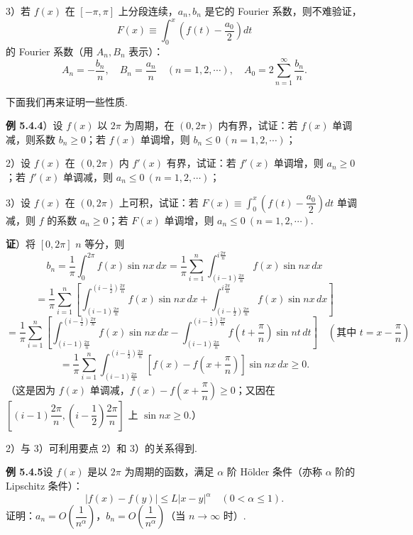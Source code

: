 \documentclass[UTF8, 12pt, fontset=fandol, oneside]{ctexart}
\begin{document}
3）若 $f(x)$ 在 $[-\pi,\pi]$ 上分段连续，$a_n,b_n$ 是它的 Fourier 系数，则不难验证，
\[
  F(x)\equiv\int_0^x\left(f(t)-\frac{a_0}2\right)dt
\]
的 Fourier 系数（用 $A_n,B_n$ 表示）：
\[
  A_n=-\frac{b_n}{n},\quad B_n=\frac{a_n}{n}\quad(n=1,2,\cdots),\quad
  A_0=2\sum_{n=1}^{\infty}\frac{b_n}{n}.
\]

下面我们再来证明一些性质.

\noindent\textbf{例 5.4.4}）设 $f(x)$ 以 $2\pi$ 为周期，在 $(0,2\pi)$ 内有界，试证：若 $f(x)$ 单调减，则系数 $b_n\ge0$；若 $f(x)$ 单调增，则 $b_n\le0\ (n=1,2,\cdots)$；

2）设 $f(x)$ 在 $(0,2\pi)$ 内 $f'(x)$ 有界，试证：若 $f'(x)$ 单调增，则 $a_n\ge0$；若 $f'(x)$ 单调减，则 $a_n\le0\ (n=1,2,\cdots)$；

3）设 $f(x)$ 在 $(0,2\pi)$ 上可积，试证：若 $F(x)\equiv\displaystyle\int_0^x\left(f(t)-\dfrac{a_0}2\right)dt$ 单调减，则 $f$ 的系数 $a_n\ge0$；若 $F(x)$ 单调增，则 $a_n\le0\ (n=1,2,\cdots)$.

\noindent\textbf{证}）将 $[0,2\pi]$ $n$ 等分，则
\[
  b_n=\frac1\pi\int_0^{2\pi}f(x)\sin nx\,dx
  =\frac1\pi\sum_{i=1}^n\int_{(i-1)\frac{2\pi}n}^{i\frac{2\pi}n}f(x)\sin nx\,dx
\]
\[
  =\frac1\pi\sum_{i=1}^n\left[
  \int_{(i-1)\frac{2\pi}n}^{(i-\frac12)\frac{2\pi}n}f(x)\sin nx\,dx
  +\int_{(i-\frac12)\frac{2\pi}n}^{i\frac{2\pi}n}f(x)\sin nx\,dx\right]
\]
\[
  =\frac1\pi\sum_{i=1}^n\left[
  \int_{(i-1)\frac{2\pi}n}^{(i-\frac12)\frac{2\pi}n}f(x)\sin nx\,dx
  -\int_{(i-1)\frac{2\pi}n}^{(i-\frac12)\frac{2\pi}n}f\left(t+\frac\pi n\right)\sin nt\,dt\right]\quad\left(\text{其中 }t=x-\frac\pi n\right)
\]
\[
  =\frac1\pi\sum_{i=1}^n
  \int_{(i-1)\frac{2\pi}n}^{(i-\frac12)\frac{2\pi}n}
  \left[f(x)-f\left(x+\frac\pi n\right)\right]\sin nx\,dx\ge0.
\]
（这是因为 $f(x)$ 单调减，$f(x)-f\left(x+\dfrac\pi n\right)\ge0$；又因在
$\left[(i-1)\dfrac{2\pi}n,\left(i-\dfrac12\right)\dfrac{2\pi}n\right]$ 上 $\sin nx\ge0$.）

2）与 3）可利用要点 2）和 3）的关系得到.

\noindent\textbf{例 5.4.5}\quad 设 $f(x)$ 是以 $2\pi$ 为周期的函数，满足 $\alpha$ 阶 H\"older 条件（亦称 $\alpha$ 阶的 Lipschitz 条件）：
\[
  |f(x)-f(y)|\le L|x-y|^{\alpha}\quad(0<\alpha\le1).
\]
证明：$a_n=O\left(\dfrac1{n^{\alpha}}\right)$，$b_n=O\left(\dfrac1{n^{\alpha}}\right)$（当 $n\to\infty$ 时）.
\end{document}
